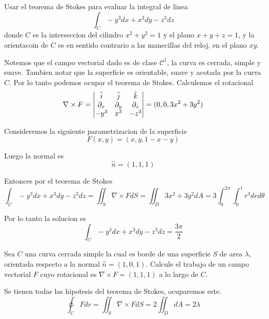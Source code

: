 \documentclass[../main.tex]{subfiles}
\begin{document}
\begin{problem}
  Usar el teorema de Stokes para evaluar la integral de linea
  \begin{equation*}
    \int_{C} -y^{3} dx + x^{3} dy - z^{3} dz
  \end{equation*}
  donde $C$ es la interseccion del cilindro $x^{2} + y^{2} = 1$ y el plano $x + y + z = 1$, y la
  orientacoin de $C$ es en sentido contrario a las manecillas del reloj, en el plano $xy$.
\end{problem}
\begin{solution}
  Notemos que el campo vectorial dado es de clase $\mathcal{C}^{1}$, la curva es cerrada, simple y suave. Tambien notar que la superficie es orientable, suave y acotada por la curva $C$. Por lo tanto podemos ocupar el teorema de Stokes. Calculemos el rotacional
  \begin{equation*}
    \nabla \times F = \begin{vmatrix} \hat{i} & \hat{j} & \hat{k}\\ \partial_x & \partial_y & \partial_z\\ -y^{3} & x^{3} & -z^{3}\end{vmatrix} = (0, 0, 3x^{2} + 3y^{2})
  \end{equation*}

  Consideremos la siguiente parametrizacion de la superficie
  \begin{equation*}
    F(x, y) = (x, y, 1 - x - y)
  \end{equation*}

  Luego la normal es
  \begin{equation*}
    \hat{n} = (1, 1, 1)
  \end{equation*}

  Entonces por el teorema de Stokes
  \begin{equation*}
    \int_{C} -y^{3} dx + x^{3}dy - z^{3} dz = \iint_{S} \nabla \times F dS = \iint_{D} 3x^{2} + 3y^{2} dA = 3\int_{0}^{2\pi}\int_{0}^{1}r^{3} dr d\theta
  \end{equation*}

  Por lo tanto la solucion es
  \begin{equation*}
    \int_{C} -y^{3} dx + x^{3}dy - z^{3} dz = \frac{3\pi}{2}
  \end{equation*}
\end{solution}

\begin{problem}
  Sea $C$ una curva cerrada simple la cual es borde de una superficie $S$ de area $\lambda$, orientada respecto a la normal $\hat{n} = (1, 0, 1)$. Calcule el trabajo de un campo vectorial
  $F$ cuyo rotacional es $\nabla \times F = (1, 1, 1)$ a lo largo de $C$.
\end{problem}
\begin{solution}
  Se tienen todas las hipotesis del teorema de Stokes, ocuparemos este.
  \begin{equation*}
    \oint_{C} F dr = \iint_{S} \nabla \times F dS = 2 \iint_{D} dA = 2 \lambda
  \end{equation*}
\end{solution}
\end{document}
